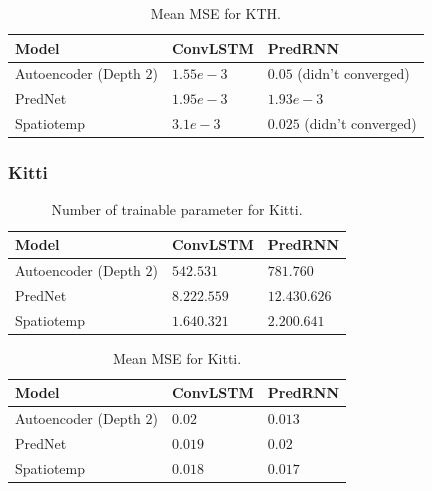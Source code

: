    \begin{table}[H]
    \begin{center}
     \begin{tabular}{| l | l | l |}\hline
      \textbf{Model} & \textbf{ConvLSTM} & \textbf{PredRNN} \\\hline
      Autoencoder (Depth $2$) & $1.55e-3$ & $0.05$ (didn't converged) \\\hline
      PredNet & $1.95e-3$ & $1.93e-3$ \\\hline
      Spatiotemp & $3.1e-3$ & $0.025$ (didn't converged) \\\hline
     \end{tabular}
    \end{center}
    \caption{Mean MSE for KTH.}
   \end{table}
  
  \subsubsection{Kitti}
   \begin{table}[H]
    \begin{center}
     \begin{tabular}{| l | l | l |}\hline
      \textbf{Model} & \textbf{ConvLSTM} & \textbf{PredRNN} \\\hline
      Autoencoder (Depth $2$) & $542.531$ & $781.760$ \\\hline
      PredNet & $8.222.559$ & $12.430.626$ \\\hline
      Spatiotemp & $1.640.321$ & $2.200.641$ \\\hline
     \end{tabular}
    \end{center}
    \caption{Number of trainable parameter for Kitti.}
   \end{table}\noindent
   \begin{table}[H]
    \begin{center}
     \begin{tabular}{| l | l | l |}\hline
      \textbf{Model} & \textbf{ConvLSTM} & \textbf{PredRNN} \\\hline
      Autoencoder (Depth $2$) & $0.02$ & $0.013$ \\\hline
      PredNet & $0.019$ & $0.02$ \\\hline
      Spatiotemp & $0.018$ & $0.017$ \\\hline
     \end{tabular}
    \end{center}
    \caption{Mean MSE for Kitti.}
   \end{table}
